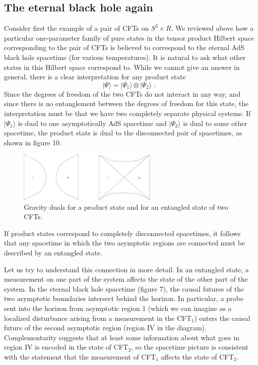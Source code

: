\documentclass[12pt,epsf]{article}
\renewcommand{\(}{\left(}
\renewcommand{\)}{\right)}
\begin{document}
\subsection{The eternal black hole again}

Consider first the example of a pair of CFTs on $S^3 \times R$. We reviewed above how a particular one-parameter family of pure states in the tensor product Hilbert space corresponding to the pair of CFTs is believed to correspond to the eternal AdS black hole spacetime (for various temperatures). It is natural to ask what other states in this Hilbert space correspond to. While we cannot give an answer in general, there is a clear interpretation for any product state
\[
|\Psi \rangle = |\Psi_1 \rangle \otimes |\Psi_2 \rangle \; .
\]
Since the degrees of freedom of the two CFTs do not interact in any way, and since there is no entanglement between the degrees of freedom for this state, the interpretation must be that we have two completely separate physical systems. If $|\Psi_1 \rangle$ is dual to one asymptotically AdS spacetime and $|\Psi_2 \rangle$ is dual to some other spacetime, the product state is dual to the disconnected pair of  spacetimes, as shown in figure 10.
\begin{figure}
\centering
\includegraphics[width=0.6\textwidth]{disjoint.eps}
\caption{Gravity duals for a product state and for an entangled state of two CFTs.}
\end{figure}
If product states correspond to completely disconnected spacetimes, it follows that any spacetime in which the two asymptotic regions are connected must be described by an entangled state.

Let us try to understand this connection in more detail. In an entangled state, a measurement on one part of the system affects the state of the other part of the system. In the eternal black hole spacetime (figure 7), the causal futures of the two asymptotic boundaries intersect behind the horizon. In particular, a probe sent into the horizon from asymptotic region 1 (which we can imagine as a localized disturbance arising from a measurement in the CFT${}_1$) enters the causal future of the second asymptotic region (region IV in the diagram). Complementarity suggests that at least some information about what goes in region IV is encoded in the state of CFT${}_2$, so the spacetime picture is consistent with the statement that the measurement of CFT${}_1$ affects the state of CFT${}_2$.
\end{document}
